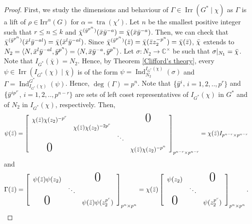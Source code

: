 \documentclass[a4paper,11pt]{amsart}
\numberwithin{equation}{section}
\numberwithin{equation}{subsection}
\newcommand{\C}{\mathbb{C}}
\newcommand{\irr}{\mathrm{Irr}}
\newcommand{\bchi}{\Bar{\chi}}
\newcommand{\x}{\Bar{x}}
\newcommand{\y}{\Bar{y}}
\newcommand{\z}{\Bar{z}}
\newcommand{\tra}{\operatorname{tra}}
\newcommand{\poonam}[1]{{\color{blue} #1}}
\begin{document}
\begin{proof}
	
	First, we study the dimensions and behaviour of $\Gamma \in \operatorname{Irr}(G^* \mid \chi)$ as $\Gamma$ is a lift of $\rho \in \irr^\alpha(G)$ for $\alpha= \tra(\chi')$. Let $n$ be the smallest positive integer such that $r \leq n\leq k$ and $\bchi^{(\y^{p^n})}(\x\y^{-a}) = \bchi(\x\y^{-a})$. 
	Then, we can check that $\bchi^{(\y^{p^n})}(\x^l\y^{-al}) = \bchi(\x^l\y^{-al})$. Since $\bchi^{(\y^{p^n})}(\z) = \bchi(\z z_2^{-p^n})= \bchi(\z)$, $\bchi$ extends to $N_2= \langle N,\x^l\y^{-al}, \y^{p^n} \rangle =\langle N,\x\y^{-a}, \y^{p^n} \rangle$. Let $\sigma: N_2 \to \C^\times$ be such that $\sigma|_{N_1} = \bchi$. 
	Note that $I_{G^*}(\bar{\chi}) =  N_2$. Hence, by Theorem \ref{Clifford's theory}, every $\psi \in \operatorname{Irr}(I_{G^*}(\chi) \mid \bar{\chi})$ is of the form $\psi= \operatorname{Ind}^{I_{G^*}(\chi)}_{N_2}(\sigma)$ and $\Gamma = \operatorname{Ind}^{G^*}_{{I_{G^*}(\chi)}}(\psi)$. Hence, $\operatorname{deg}(\Gamma)= p^n$. Note that $\{\y^i$, $i=1,2,..,p^r\}$ and $\{\y^{ip^r}$, $i=1,2,..,p^{n-r}\}$ are sets of left coset representatives of $I_{{G}^*}(\chi)$ in $G^*$ and of $N_2$ in $I_{{G}^*}(\chi)$, respectively. Then, 
	$$\psi(\z)= \left[\begin{array}{cccc}
		\chi(\z)\chi(z_2)^{-p^r} & & & \text{\huge0} \\
		& \chi(\z)\chi(z_2)^{-2p^r} & & \\
		& & \ddots & \\
		\text{\huge0} & & & \chi(\z)\chi(z_2)^{-p^n} 
	\end{array}\right]_{p^{n-r} \times p^{n-r}}= \chi(\z)I_{p^{n-r} \times p^{n-r}}$$ and  $$\Gamma(\z)= \left[\begin{array}{ccc}
		\psi(\z)\psi(z_2)& & \text{\huge0} \\
		& \ddots & \\
		\text{\huge0} &  & \psi(\z)\psi(z_2^{p^r})
	\end{array}\right]_{p^n \times p^n} = \chi(\z)\left[\begin{array}{ccc}
		\psi(z_2)& & \text{\huge0} \\
		& \ddots & \\
		\text{\huge0} &  & \psi(z_2^{p^r})
	\end{array}\right]_{p^n \times p^n}.$$ 
	
	\bigskip
	

\end{proof}
\end{document}
